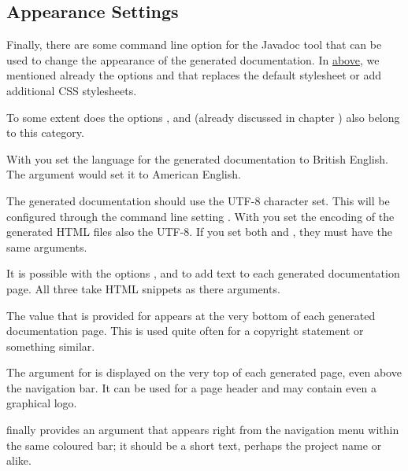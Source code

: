 \subsection{Appearance Settings}\label{sec:AppearanceSettings}
Finally, there are some command line option for the Javadoc tool that can be used to change the appearance of the generated documentation. In  \hyperref[sec:Locations]{above}, we mentioned already the options \mbox{} and \mbox{} that replaces the default stylesheet or add additional CSS stylesheets.

To some extent does the options \mbox{}, \mbox{} and \mbox{} (already discussed in chapter ) also belong to this category.

With \mbox{} you set the language for the generated documentation to British English. The argument \mbox{} would set it to American English.

The generated documentation should use the UTF-8 character set. This will be configured through the command line setting \mbox{}. With \mbox{} you set the encoding of the generated HTML files also the UTF-8. If you set both \mbox{} and \mbox{}, they must have the same arguments.

It is possible with the options \mbox{}, \mbox{} and \mbox{} to add text to each generated documentation page. All three take HTML snippets as there arguments.

The value that is provided for \mbox{} appears at the very bottom of each generated documentation page. This is used quite often for a copyright statement or something similar.

The argument for \mbox{} is displayed on the very top of each generated page, even above the navigation bar. It can be used for a page header and may contain even a graphical logo.

\mbox{} finally provides an argument that appears right from the navigation menu within the same coloured bar; it should be a short text, perhaps the project name or alike.

